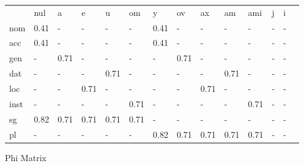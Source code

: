 \documentclass{article}
\begin{document}
\begin{tabular}{llllllllllllll}\toprule
                  &nul     &a       &e       &u       &om      &y       &ov      &ax      &am      &ami     &j       &i       \\ 
nom            &  0.41  &    -   &    -   &    -   &    -   &  0.41  &    -   &    -   &    -   &    -   &    -   &    -   \\ 
acc            &  0.41  &    -   &    -   &    -   &    -   &  0.41  &    -   &    -   &    -   &    -   &    -   &    -   \\ 
gen            &    -   &  0.71  &    -   &    -   &    -   &    -   &  0.71  &    -   &    -   &    -   &    -   &    -   \\ 
dat            &    -   &    -   &    -   &  0.71  &    -   &    -   &    -   &    -   &  0.71  &    -   &    -   &    -   \\ 
loc            &    -   &    -   &  0.71  &    -   &    -   &    -   &    -   &  0.71  &    -   &    -   &    -   &    -   \\ 
inst           &    -   &    -   &    -   &    -   &  0.71  &    -   &    -   &    -   &    -   &  0.71  &    -   &    -   \\ 
sg             &  0.82  &  0.71  &  0.71  &  0.71  &  0.71  &    -   &    -   &    -   &    -   &    -   &    -   &    -   \\ 
pl             &    -   &    -   &    -   &    -   &    -   &  0.82  &  0.71  &  0.71  &  0.71  &  0.71  &    -   &    -   \\ 
\end{tabular}

 \vspace{0.2in}
 


Phi Matrix 
\end{document}
